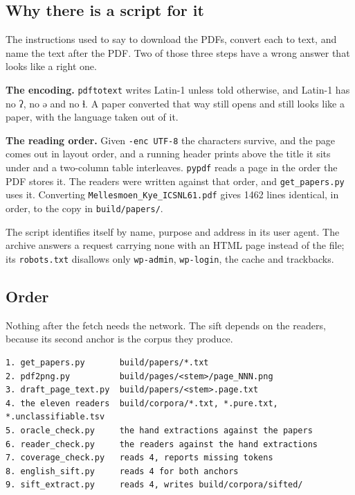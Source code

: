 \subsection{Why there is a script for it}

The instructions used to say to download the PDFs, convert each to text, and name the text after the PDF. Two of those three steps have a wrong answer that looks like a right one.

\textbf{The encoding.} \texttt{pdftotext} writes Latin-1 unless told otherwise, and Latin-1 has no ʔ, no ə and no ɬ. A paper converted that way still opens and still looks like a paper, with the language taken out of it.

\textbf{The reading order.} Given \texttt{-\allowbreak{}enc UTF-\allowbreak{}8} the characters survive, and the page comes out in layout order, and a running header prints above the title it sits under and a two-column table interleaves. \texttt{pypdf} reads a page in the order the PDF stores it. The readers were written against that order, and \texttt{get\_\allowbreak{}papers.\allowbreak{}py} uses it. Converting \texttt{Mellesmoen\_\allowbreak{}Kye\_\allowbreak{}ICSNL61.\allowbreak{}pdf} gives 1462 lines identical, in order, to the copy in \texttt{build/\allowbreak{}papers/\allowbreak{}}.

The script identifies itself by name, purpose and address in its user agent. The archive answers a request carrying none with an HTML page instead of the file; its \texttt{robots.\allowbreak{}txt} disallows only \texttt{wp-\allowbreak{}admin}, \texttt{wp-\allowbreak{}login}, the cache and trackbacks.

\subsection{Order}

Nothing after the fetch needs the network. The sift depends on the readers, because its second anchor is the corpus they produce.

\begin{lstlisting}[breaklines=true,breakatwhitespace=false,basicstyle=\ttfamily\small]
1. get_papers.py       build/papers/*.txt
2. pdf2png.py          build/pages/<stem>/page_NNN.png
3. draft_page_text.py  build/papers/<stem>.page.txt
4. the eleven readers  build/corpora/*.txt, *.pure.txt, *.unclassifiable.tsv
5. oracle_check.py     the hand extractions against the papers
6. reader_check.py     the readers against the hand extractions
7. coverage_check.py   reads 4, reports missing tokens
8. english_sift.py     reads 4 for both anchors
9. sift_extract.py     reads 4, writes build/corpora/sifted/
\end{lstlisting}


